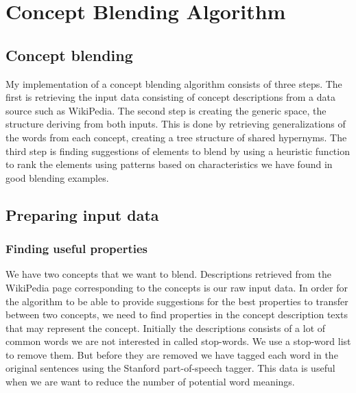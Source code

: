 
\chapter{Concept Blending Algorithm} %

\label{Chapter5} %


\section{Concept blending}
My implementation of a concept blending algorithm consists of three steps. The first is retrieving the input data consisting of concept descriptions from a data source such as WikiPedia. The second step is creating the generic space, the structure deriving from both inputs. This is done by retrieving generalizations of the words from each concept, creating a tree structure of shared hypernyms. The third step is finding suggestions of elements to blend by using a heuristic function to rank the elements using patterns based on characteristics we have found in good blending examples.


\section{Preparing input data}

\subsection{Finding useful properties}
We have two concepts that we want to blend. Descriptions retrieved from the WikiPedia page corresponding to the concepts is our raw input data.
In order for the algorithm to be able to provide suggestions for the best properties to transfer between two concepts, we need to find properties in the concept description texts that may represent the concept. Initially the descriptions consists of a lot of common words we are not interested in called stop-words. We use a stop-word list to remove them. But before they are removed we have tagged each word in the original sentences using the Stanford part-of-speech tagger. This data is useful when we are want to reduce the number of potential word meanings.

